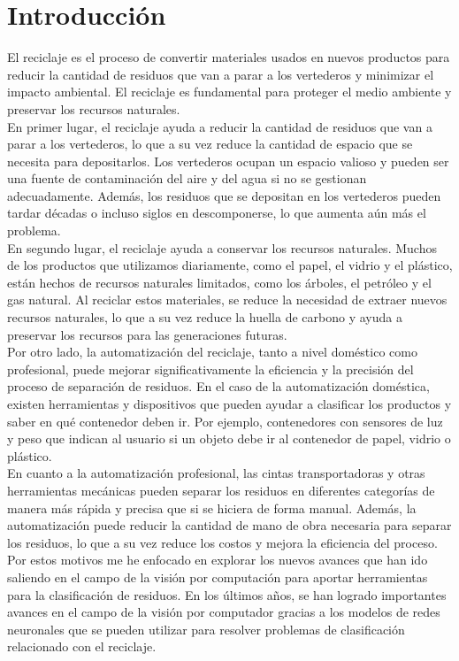\documentclass[10pt,a4paper,twocolumn,twoside]{article}
\begin{document}
\renewcommand\thefootnote{}

\section{Introducción}

El reciclaje es el proceso de convertir materiales usados en nuevos productos para reducir
la cantidad de residuos que van a parar a los vertederos y minimizar el impacto ambiental.
El reciclaje es fundamental para proteger el medio ambiente y preservar los recursos naturales.\\
En primer lugar, el reciclaje ayuda a reducir la cantidad de residuos que van a parar a los vertederos,
lo que a su vez reduce la cantidad de espacio que se necesita para depositarlos. Los vertederos ocupan
un espacio valioso y pueden ser una fuente de contaminación del aire y del agua si no se gestionan
adecuadamente. Además, los residuos que se depositan en los vertederos pueden tardar décadas o incluso
siglos en descomponerse, lo que aumenta aún más el problema.\\
En segundo lugar, el reciclaje ayuda a conservar los recursos naturales. Muchos de los productos
que utilizamos diariamente, como el papel, el vidrio y el plástico, están hechos de recursos
naturales limitados, como los árboles, el petróleo y el gas natural. Al reciclar estos materiales,
se reduce la necesidad de extraer nuevos recursos naturales, lo que a su vez reduce la huella de
carbono y ayuda a preservar los recursos para las generaciones futuras.\\
Por otro lado, la automatización del reciclaje, tanto a nivel doméstico como profesional, puede mejorar
significativamente la eficiencia y la precisión del proceso de separación de residuos. En el caso de la
automatización doméstica, existen herramientas y dispositivos que pueden ayudar a clasificar los productos
y saber en qué contenedor deben ir. Por ejemplo, contenedores con sensores de luz y peso que indican al
usuario si un objeto debe ir al contenedor de papel, vidrio o plástico.\\
En cuanto a la automatización profesional, las cintas transportadoras y otras herramientas mecánicas
pueden separar los residuos en diferentes categorías de manera más rápida y precisa que si se hiciera
de forma manual. Además, la automatización puede reducir la cantidad de mano de obra necesaria para
separar los residuos, lo que a su vez reduce los costos y mejora la eficiencia del proceso.\\
Por estos motivos me he enfocado en explorar los nuevos avances que han ido saliendo en el campo
de la visión por computación para aportar herramientas para la clasificación de residuos. En los
últimos años, se han logrado importantes avances en el campo de la visión por computador gracias
a los modelos de redes neuronales que se pueden utilizar para resolver problemas de clasificación
relacionado con el reciclaje. \cite{reciclaje}
\end{document}
